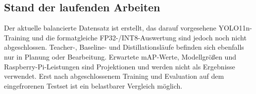 \subsection{Stand der laufenden Arbeiten}
Der aktuelle balancierte Datensatz ist erstellt, das darauf vorgesehene YOLO11n-Training und die formatgleiche FP32-/INT8-Auswertung sind jedoch noch nicht abgeschlossen. Teacher-, Baseline- und Distillationsläufe befinden sich ebenfalls nur in Planung oder Bearbeitung. Erwartete mAP-Werte, Modellgrößen und Raspberry-Pi-Leistungen sind Projektionen und werden nicht als Ergebnisse verwendet. Erst nach abgeschlossenem Training und Evaluation auf dem eingefrorenen Testset ist ein belastbarer Vergleich möglich.
